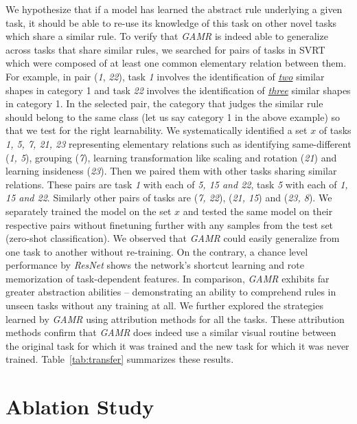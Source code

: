 We hypothesize that if a model has learned the abstract rule underlying a given task, it should be able to re-use its knowledge of this task on other novel tasks which share a similar rule. To verify that \textit{GAMR} is indeed able to generalize across tasks that share similar rules, we searched for pairs of tasks in SVRT which were composed of at least one common elementary relation \citep{vaishnav2021understanding} between them. For example, in pair (\textit{1}, \textit{22}), task \textit{1} involves the identification of \underline{\textit{two}} similar shapes in category 1 and task \textit{22} involves the identification of \underline{\textit{three}} similar shapes in category 1. In the selected pair, the category that judges the similar rule should belong to the same class (let us say category 1 in the above example) so that we test for the right learnability. We systematically identified a set $x$ of tasks \textit{1, 5, 7, 21, 23} representing elementary relations such as identifying same-different (\textit{1, 5}), grouping (\textit{7}), learning transformation like scaling and rotation (\textit{21}) and learning insideness (\textit{23}). Then we paired them with other tasks sharing similar relations. 
These pairs are task \textit{1} with each of \textit{5, 15 and 22}, task \textit{5} with each of \textit{1, 15 and 22}. Similarly other pairs of tasks are (\textit{7, 22}), (\textit{21, 15}) and (\textit{23, 8}). 
We separately trained the model on the set $x$ and tested the same model on their respective pairs without finetuning further with any samples from the test set (zero-shot classification). 
We observed that \textit{GAMR} could easily generalize from one task to another without re-training. On the contrary, a chance level performance by \textit{ResNet} shows the network's shortcut learning and rote memorization of task-dependent features. In comparison, \textit{GAMR} exhibits far greater abstraction abilities -- demonstrating an ability to comprehend rules in unseen tasks without any training at all. We further explored the strategies learned by \textit{GAMR} using attribution methods for all the tasks. These attribution methods confirm that \textit{GAMR} does indeed use a similar visual routine between the original task for which it was trained and the new task for which it was never trained. Table~\ref{tab:transfer} summarizes these results. 


\section{Ablation Study}
\label{sec:abl}


